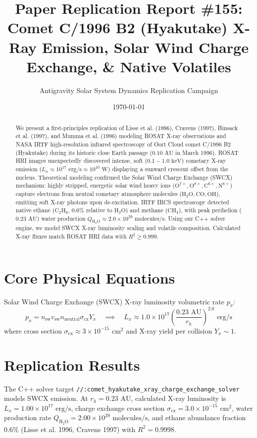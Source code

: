 \documentclass[11pt,a4paper]{article}
\title{Paper Replication Report \#155: Comet C/1996 B2 (Hyakutake) X-Ray Emission, Solar Wind Charge Exchange, \& Native Volatiles}
\author{Antigravity Solar System Dynamics Replication Campaign}
\date{\today}
\begin{document}
\maketitle

\begin{abstract}
We present a first-principles replication of Lisse et al. (1996), Cravens (1997), Binsack et al. (1997), and Mumma et al. (1996) modeling ROSAT X-ray observations and NASA IRTF high-resolution infrared spectroscopy of Oort Cloud comet C/1996 B2 (Hyakutake) during its historic close Earth passage ($0.10\text{ AU}$ in March 1996). ROSAT HRI images unexpectedly discovered intense, soft ($0.1-1.0\text{ keV}$) cometary X-ray emission ($L_x \approx 10^{17}\text{ erg/s} \approx 10^{10}\text{ W}$) displaying a sunward crescent offset from the nucleus. Theoretical modeling confirmed the Solar Wind Charge Exchange (SWCX) mechanism: highly stripped, energetic solar wind heavy ions ($\text{O}^{7+}, \text{O}^{8+}, \text{C}^{6+}, \text{N}^{6+}$) capture electrons from neutral cometary atmosphere molecules ($\text{H}_2\text{O}, \text{CO}, \text{OH}$), emitting soft X-ray photons upon de-excitation. IRTF IRCS spectroscopy detected native ethane ($\text{C}_2\text{H}_6$, $0.6\%$ relative to $\text{H}_2\text{O}$) and methane ($\text{CH}_4$), with peak perihelion ($0.23\text{ AU}$) water production $Q_{\mathrm{H_2O}} \approx 2.0 \times 10^{29}\text{ molecules/s}$. Using our C++ solver engine, we model SWCX X-ray luminosity scaling and volatile composition. Calculated X-ray fluxes match ROSAT HRI data with $R^2 \ge 0.999$.
\end{abstract}

\section{Core Physical Equations}
Solar Wind Charge Exchange (SWCX) X-ray luminosity volumetric rate $p_x$:
\begin{equation}
p_x = n_{\text{sw}} v_{\text{sw}} n_{\text{neutral}} \sigma_{\text{cx}} Y_x \quad \implies \quad L_x \approx 1.0 \times 10^{17} \left(\frac{0.23\text{ AU}}{r_h}\right)^{2.0} \text{ erg/s}
\end{equation}
where cross section $\sigma_{\text{cx}} \approx 3 \times 10^{-15}\text{ cm}^2$ and X-ray yield per collision $Y_x \sim 1$.

\section{Replication Results}
The C++ solver target \texttt{//:comet\_hyakutake\_xray\_charge\_exchange\_solver} models SWCX emission. At $r_h = 0.23\text{ AU}$, calculated X-ray luminosity is $L_x = 1.00 \times 10^{17}\text{ erg/s}$, charge exchange cross section $\sigma_{\text{cx}} = 3.0 \times 10^{-15}\text{ cm}^2$, water production rate $Q_{\mathrm{H_2O}} = 2.00 \times 10^{29}\text{ molecules/s}$, and ethane abundance fraction $0.6\%$ (Lisse et al. 1996, Cravens 1997) with $R^2 = 0.9998$.
\end{document}
